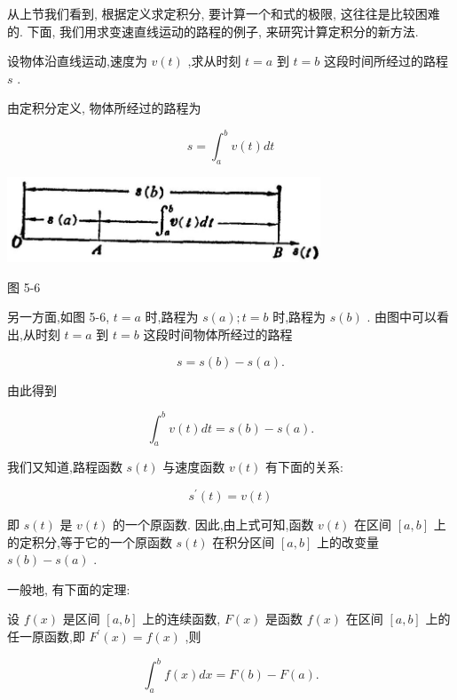 \documentclass[lang=cn,newtx,12pt,scheme=chinese]{elegantbook}
\begin{document}
从上节我们看到, 根据定义求定积分, 要计算一个和式的极限, 这往往是比较困难的. 下面, 我们用求变速直线运动的路程的例子, 来研究计算定积分的新方法.

设物体沿直线运动,速度为 \(v\left( t\right)\) ,求从时刻 \(t = a\) 到 \(t = b\) 这段时间所经过的路程 \(s\) .

由定积分定义, 物体所经过的路程为

\[
s = {\int }_{a}^{b}v\left( t\right) {dt}
\]

\begin{center}
\includegraphics[max width=0.7\textwidth]{images/01912c18-5c3f-733d-b775-749ba9897a9d_225_134815.jpg}
\end{center}

图 5-6

另一方面,如图 5-6, \(t = a\) 时,路程为 \(s\left( a\right) ;t = b\) 时,路程为 \(s\left( b\right)\) . 由图中可以看出,从时刻 \(t = a\) 到 \(t = b\) 这段时间物体所经过的路程

\[
s = s\left( b\right) - s\left( a\right) .
\]

由此得到

\[
{\int }_{a}^{b}v\left( t\right) {dt} = s\left( b\right) - s\left( a\right) .
\]

我们又知道,路程函数 \(s\left( t\right)\) 与速度函数 \(v\left( t\right)\) 有下面的关系:

\[
{s}^{\prime }\left( t\right) = v\left( t\right)
\]

即 \(s\left( t\right)\) 是 \(v\left( t\right)\) 的一个原函数. 因此,由上式可知,函数 \(v\left( t\right)\) 在区间 \(\left\lbrack {a,b}\right\rbrack\) 上的定积分,等于它的一个原函数 \(s\left( t\right)\) 在积分区间 \(\left\lbrack {a,b}\right\rbrack\) 上的改变量 \(s\left( b\right) - s\left( a\right)\) .

一般地, 有下面的定理:

\begin{theorem}[定理]

设 \(f\left( x\right)\) 是区间 \(\left\lbrack {a,b}\right\rbrack\) 上的连续函数, \(F\left( x\right)\) 是函数 \(f\left( x\right)\) 在区间 \(\left\lbrack {a,b}\right\rbrack\) 上的任一原函数,即 \({F}^{\prime }\left( x\right) = f\left( x\right)\) ,则

\[
{\int }_{a}^{b}f\left( x\right) {dx} = F\left( b\right) - F\left( a\right) .
\]

\end{theorem}
\end{document}
